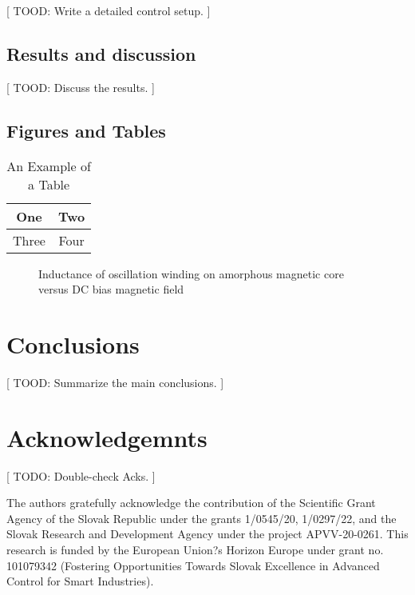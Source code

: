 \documentclass[letterpaper, 10 pt, conference]{ieeeconf}
\begin{document}
[ TOOD: Write a detailed control setup. ]

\subsection{Results and discussion}
\label{sec:results}

[ TOOD: Discuss the results. ]

\subsection{Figures and Tables}

\begin{table}[h]
\caption{An Example of a Table}
\label{table_example}
\begin{center}
\begin{tabular}{|c||c|}
\hline
One & Two\\
\hline
Three & Four\\
\hline
\end{tabular}
\end{center}
\end{table}


\begin{figure}[thpb]
      \centering
      \caption{Inductance of oscillation winding on amorphous
       magnetic core versus DC bias magnetic field}
      \label{figurelabel}
   \end{figure}
   
\section{Conclusions}
\label{sec:conclusions}

[ TOOD: Summarize the main conclusions. ]

\addtolength{\textheight}{-12cm}

\section*{Acknowledgemnts}

[ TODO: Double-check Acks. ]

The authors gratefully acknowledge the contribution of the Scientific Grant Agency of the Slovak Republic under the grants 1/0545/20, 1/0297/22, and the Slovak Research and Development Agency under the project APVV-20-0261. This research is funded by the European Union?s Horizon Europe under grant no. 101079342 (Fostering Opportunities Towards Slovak Excellence in Advanced Control for Smart Industries).



\end{document}
